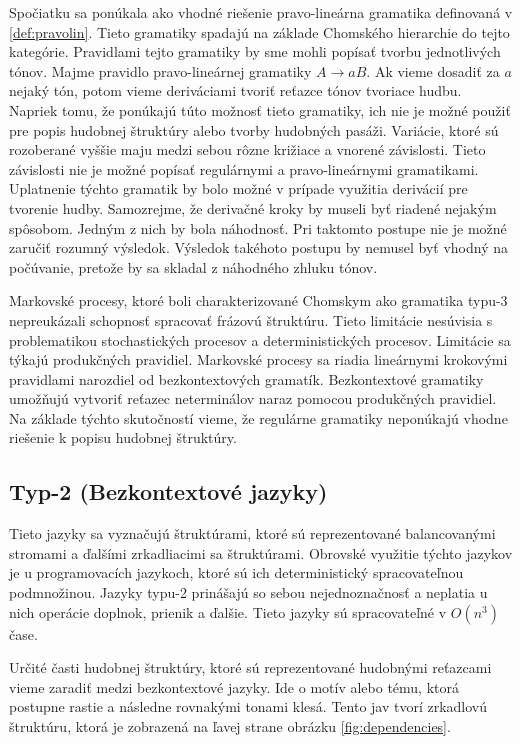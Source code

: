 Spočiatku sa ponúkala ako vhodné riešenie pravo-lineárna gramatika definovaná v \ref{def:pravolin}. Tieto gramatiky spadajú na základe Chomského hierarchie do tejto kategórie. Pravidlami tejto gramatiky by sme mohli popísať tvorbu jednotlivých tónov. Majme pravidlo pravo-lineárnej gramatiky $A \rightarrow aB$. Ak vieme dosadiť za $a$ nejaký tón, potom vieme deriváciami tvoriť reťazce tónov tvoriace hudbu. Napriek tomu, že ponúkajú túto možnosť tieto gramatiky, ich nie je možné použiť pre popis hudobnej štruktúry alebo tvorby hudobných pasáži. Variácie, ktoré sú rozoberané vyššie maju medzi sebou rôzne križiace a vnorené závislosti. Tieto závislosti nie je možné popísať regulárnymi a pravo-lineárnymi gramatikami. Uplatnenie týchto gramatik by bolo možné v prípade využitia derivácií pre tvorenie hudby. Samozrejme, že derivačné kroky by museli byť riadené nejakým spôsobom. Jedným z nich by bola náhodnosť. Pri taktomto postupe nie je možné zaručiť rozumný výsledok. Výsledok takéhoto postupu by nemusel byť vhodný na počúvanie, pretože by sa skladal z náhodného zhluku tónov.

Markovské procesy, ktoré boli charakterizované Chomskym ako gramatika typu-3 nepreukázali schopnosť spracovať frázovú štruktúru. Tieto limitácie nesúvisia s problematikou stochastických procesov a deterministických procesov. Limitácie sa týkajú produkčných pravidiel. Markovské procesy sa riadia lineárnymi krokovými pravidlami narozdiel od bezkontextových gramatík. Bezkontextové gramatiky umožňujú vytvoriť reťazec neterminálov naraz pomocou produkčných pravidiel. Na základe týchto skutočností vieme, že regulárne gramatiky neponúkajú vhodne riešenie k popisu hudobnej štruktúry.

\subsection*{Typ-2 (Bezkontextové jazyky)}
Tieto jazyky sa vyznačujú štruktúrami, ktoré sú reprezentované balancovanými stromami a ďalšími zrkadliacimi sa štruktúrami. Obrovské využitie týchto jazykov je u programovacích jazykoch, ktoré sú ich deterministický spracovateľnou podmnožinou. Jazyky typu-2 prinášajú so sebou nejednoznačnosť a neplatia u nich operácie doplnok, prienik a ďalšie. Tieto jazyky sú spracovateľné v $O(n^3)$ čase.

Určité časti hudobnej štruktúry, ktoré sú reprezentované hudobnými reťazcami vieme zaradiť medzi bezkontextové jazyky. Ide o motív alebo tému, ktorá postupne rastie a následne rovnakými tonami klesá. Tento jav tvorí zrkadlovú štruktúru, ktorá je zobrazená na ľavej strane obrázku \ref{fig:dependencies}.

